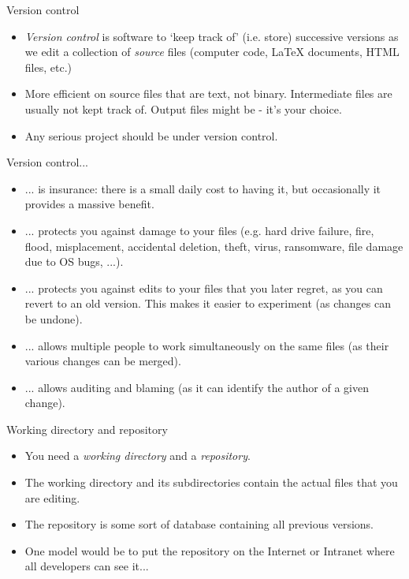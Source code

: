 \documentclass[usenames,dvipsnames]{beamer}
\begin{document}
\begin{frame}{Version control}
  \begin{block}{}
    \begin{itemize}
      \item{\textit{Version control} is software to `keep track of' (i.e. store) successive versions as we edit a collection of \textit{source} files (computer code, \LaTeX{} documents, HTML files, etc.)}
      \item{More efficient on source files that are text, not binary. Intermediate files are usually not kept track of. Output files might be - it's your choice.}
      \item{Any serious project should be under version control.}
    \end{itemize}
  \end{block}
\end{frame}


\begin{frame}{Version control...}
  \begin{block}{}
    \begin{itemize}
      \item{... is insurance: there is a small daily cost to having it, but occasionally it provides a massive benefit.}
      \item{... protects you against damage to your files (e.g. hard drive failure, fire, flood, misplacement, accidental deletion, theft, virus, ransomware, file damage due to OS bugs, ...).}
      \item{... protects you against edits to your files that you later regret, as you can revert to an old version. This makes it easier to experiment (as changes can be undone).}
      \item{... allows multiple people to work simultaneously on the same files (as their various changes can be merged).}
      \item{... allows auditing and blaming (as it can identify the author of a given change).}
    \end{itemize}
  \end{block}
\end{frame}


\begin{frame}{Working directory and repository}
  \begin{block}{}
    \begin{itemize}
      \item{You need a \textit{working directory} and a \textit{repository}.}
      \item{The working directory and its subdirectories contain the actual files that you are editing.}
      \item{The repository is some sort of database containing all previous versions.}
      \item{One model would be to put the repository on the Internet or Intranet where all developers can see it...}
    \end{itemize}
  \end{block}
\end{frame}
\end{document}
